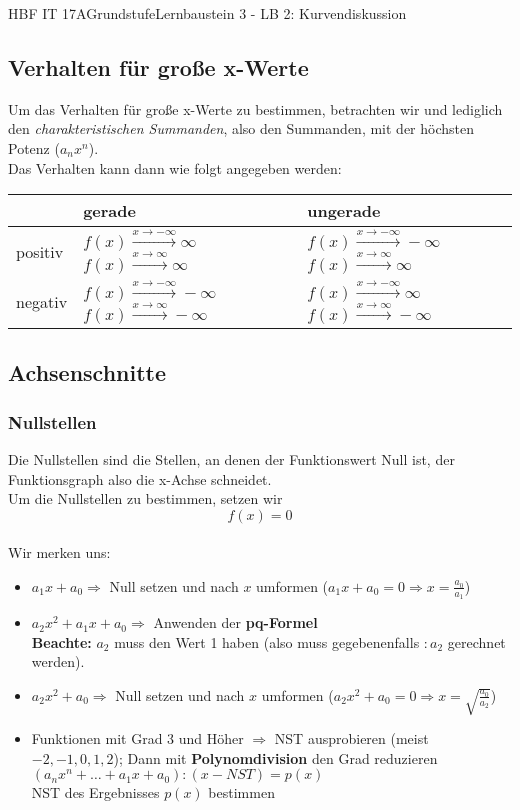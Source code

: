 \documentclass[11pt,twocolumn,oneside,openany,headings=optiontotoc,11pt,numbers=noenddot]{article}
\begin{document}
\begin{worksheet}{HBF IT 17A}{Grundstufe}{Lernbaustein 3 - LB 2: Kurvendiskussion}
		\subsection{Verhalten für große x-Werte} Um das Verhalten für große x-Werte zu bestimmen, betrachten wir und lediglich den \textit{charakteristischen Summanden}, also den Summanden, mit der höchsten Potenz (\(a_nx^n\)).\\
		Das Verhalten kann dann wie folgt angegeben werden:
		\begin{tabular}{|l|L{0.2\textwidth}|L{0.2\textwidth}|}
			\hline
			 & gerade & ungerade\\
			\hline
			positiv &  & \\
			\hline
			negativ &  & \\
			\hline
		\end{tabular}
		\subsection{Achsenschnitte}
		\subsubsection*{Nullstellen} Die Nullstellen sind die Stellen, an denen der Funktionswert Null ist, der Funktionsgraph also die x-Achse schneidet.\\
		Um die Nullstellen zu bestimmen, setzen wir \[f(x) = 0\]\\
		Wir merken uns:
		\begin{itemize}
			\item \(a_1x + a_0 \Rightarrow\) Null setzen und nach \(x\) umformen (\(a_1x + a_0 = 0 \Rightarrow x = \frac{a_0}{a_1}\))
			\item  \(a_2x^2 + a_1x + a_0 \Rightarrow\) Anwenden der \textbf{pq-Formel}\\
			\textbf{Beachte:} \(a_2\) muss den Wert 1 haben (also muss gegebenenfalls \(:a_2\) gerechnet werden).
			\item \(a_2x^2 + a_0 \Rightarrow\) Null setzen und nach \(x\) umformen (\(a_2x^2 + a_0 = 0 \Rightarrow x = \sqrt{\frac{a_0}{a_2}}\))
			\item Funktionen mit Grad 3 und Höher \(\Rightarrow\) NST ausprobieren (meist \(-2,-1,0,1,2\)); Dann mit \textbf{Polynomdivision} den Grad reduzieren\\
			\((a_nx^n + \ldots +a_1x +a_0):(x-NST) = p(x)\)\\
			NST des Ergebnisses \(p(x)\) bestimmen
		\end{itemize}

\end{worksheet}
\end{document}
